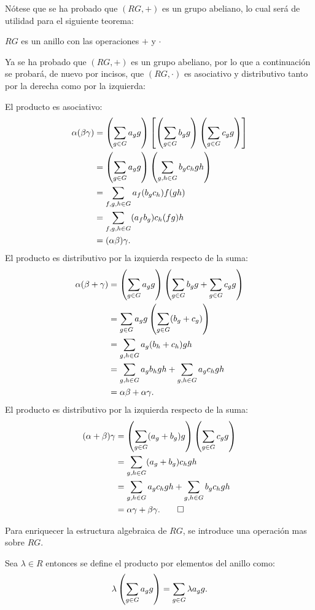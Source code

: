 Nótese que se ha probado que $(RG,+)$ es un grupo abeliano, lo cual será de utilidad para el siguiente teorema:
\begin{teorema}
$RG$ es un anillo con las operaciones $+$ y $\cdot$
\end{teorema}
\begin{proof*}
Ya se ha probado que $(RG,+)$ es un grupo abeliano, por lo que a continuación se probará, de nuevo por incisos, que $(RG,\cdot)$ es asociativo y distributivo tanto por la derecha como por la izquierda:
\begin{bulletList}
\newItem El producto es asociativo:
\begin{align*}
\alpha(\beta\gamma) &=\left(\sum_{g \in G} a_{g} g\right)\left[\left(\sum_{g \in G} b_{g} g\right)\left(\sum_{g \in G} c_{g} g\right)\right]\\ 
& = \left(\sum_{g \in G} a_{g} g\right)\left(\sum_{g,h\in G}b_gc_hgh\right)\\
&= \sum_{f,g,h \in G}a_f(b_gc_h)f(gh)\\ 
&=  \sum_{f,g,h \in G} (a_fb_g)c_h(fg)h\\
&= (\alpha\beta)\gamma.
\end{align*} 
\newItem  El producto es distributivo por la izquierda respecto de la suma:
\begin{align*}
\alpha(\beta + \gamma) &= \left( \sum_{g \in G} a_{g} g \right) \left(\sum_{g \in G} b_{g} g + \sum_{g \in G} c_{g} g \right) \\
&= \sum_{g \in G} a_{g} g \left( \sum_{g \in G}(b_g+c_g)\right)\\ 
&= \sum_{g,h \in G}a_g(b_h+c_h)gh\\  
&= \sum_{g,h \in G} a_gb_hgh + \sum_{g,h \in G} a_gc_hgh\\ &= \alpha\beta + \alpha\gamma.
\end{align*}  
\newItem El producto es distributivo por la izquierda respecto de la suma:
\begin{align*}
(\alpha + \beta)\gamma &= \left( \sum_{g\in G}(a_g+b_g)g\right) \left(\sum_{g \in G} c_{g} g\right)\\
&= \sum_{g,h \in G} (a_g+b_g)c_hgh\\ 
&= \sum_{g,h \in G}a_gc_hgh + \sum_{g,h\in G}b_gc_hgh\\ &= \alpha\gamma + \beta\gamma.\qedhere
\end{align*}
\end{bulletList}
\end{proof*}
Para enriquecer la estructura algebraica de $RG$, se introduce una operación mas sobre $RG$.
\begin{definicion}
Sea $\lambda \in R$ entonces se define el producto por elementos del anillo como: 
\begin{equation}
\lambda \left(\sum_{g \in G} a_{g} g\right) = \sum_{g \in G} \lambda a_{g} g.
\end{equation}
\end{definicion}
